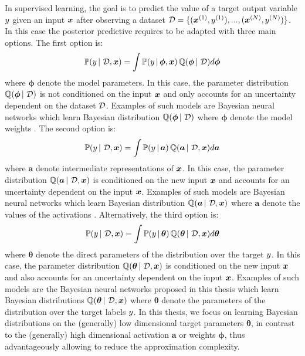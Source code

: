 In supervised learning, the goal is to predict the value of a target output variable $y$ given an input $\bm{x}$ after observing a dataset $\operatorname{\mathcal{D}}=\{(\bm{x}^{(1)}, y^{(1)}), ..., (\bm{x}^{(N)}, y^{(N)})\}$.
In this case the posterior predictive requires to be adapted with three main options. The first option is:
\begin{equation}
    \label{eq:factorization_1}
    \mathbb{P}(y \,|\, \operatorname{\mathcal{D}}, \bm{x}) = \int \mathbb{P}(y \,|\, \bm{\phi}, \bm{x}) \operatorname{\mathbb{Q}}(\bm{\phi} \,|\, \operatorname{\mathcal{D}}) d\bm{\phi}
\end{equation}
where $\bm{\phi}$ denote the model parameters. In this case, the parameter distribution $\operatorname{\mathbb{Q}}(\bm{\phi} \,|\, \operatorname{\mathcal{D}})$ is not conditioned on the input $\bm{x}$ and only accounts for an uncertainty dependent on the dataset $\operatorname{\mathcal{D}}$. Examples of such models are Bayesian neural networks which learn Bayesian distribution $\operatorname{\mathbb{Q}}(\bm{\phi} \,|\, \operatorname{\mathcal{D}})$ where $\bm{\phi}$ denote the model weights \cite{bayesian-networks}.
The second option is:
\begin{equation}
    \label{eq:factorization_2}
    \mathbb{P}(y \,|\, \operatorname{\mathcal{D}}, \bm{x}) = \int \mathbb{P}(y \,|\, \bm{a}) \operatorname{\mathbb{Q}}(\bm{a} \,|\, \operatorname{\mathcal{D}}, \bm{x}) d\bm{a}
\end{equation}
where $\bm{a}$ denote intermediate representations of $\bm{x}$. In this case, the parameter distribution $\operatorname{\mathbb{Q}}(\bm{a} \,|\, \operatorname{\mathcal{D}}, \bm{x})$ is conditioned on the new input $\bm{x}$ and accounts for an uncertainty dependent on the input $\bm{x}$. Examples of such models are Bayesian neural networks which learn Bayesian distribution $\operatorname{\mathbb{Q}}(\bm{a} \,|\, \operatorname{\mathcal{D}}, \bm{x})$ where $\bm{a}$ denote the values of the activations \cite{gp-uncertainty-activation,natural-parameter-network}.
Alternatively, the third option is:
\begin{equation}
    \label{eq:factorization_3}
    \mathbb{P}(y \,|\, \operatorname{\mathcal{D}}, \bm{x}) = \int \mathbb{P}(y \,|\, \bm{\theta}) \operatorname{\mathbb{Q}}(\bm{\theta} \,|\, \operatorname{\mathcal{D}}, \bm{x}) d\bm{\theta}
\end{equation}
where $\bm{\theta}$ denote the direct parameters of the distribution over the target $y$. In this case, the parameter distribution $\operatorname{\mathbb{Q}}(\bm{\theta} \,|\, \operatorname{\mathcal{D}}, \bm{x})$ is conditioned on the new input $\bm{x}$ and also accounts for an uncertainty dependent on the input $\bm{x}$. Examples of such models are the Bayesian neural networks proposed in this thesis \cite{charpentier2020,natpn, graph-postnet,charpentier2022uncertainty-rl,uceloss} which learn Bayesian distributions $\operatorname{\mathbb{Q}}(\bm{\theta} \,|\, \operatorname{\mathcal{D}}, \bm{x})$ where $\bm{\theta}$ denote the parameters of the distribution over the target labels $y$. In this thesis, we focus on learning  Bayesian distributions on the (generally) low dimensional target parameters $\bm{\theta}$, in contrast to the (generally) high dimensional activation $\bm{a}$ or weights  $\bm{\phi}$, thus advantageously allowing to reduce the approximation complexity.

